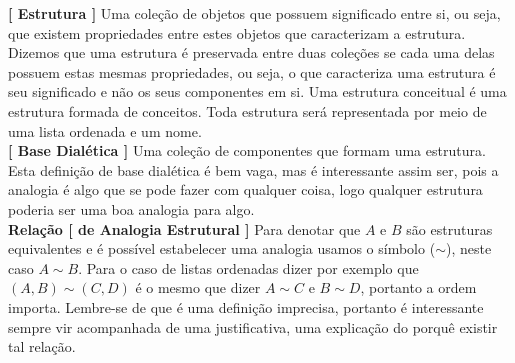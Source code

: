 \documentclass[10pt,a4paper]{report}
\begin{document}


\textbf{[ Estrutura ]} Uma coleção de objetos que possuem significado entre si, ou seja, que existem propriedades entre estes objetos que caracterizam a estrutura. Dizemos que uma estrutura é preservada entre duas coleções se cada uma delas possuem estas mesmas propriedades, ou seja, o que caracteriza uma estrutura é seu significado e não os seus componentes em si. Uma estrutura conceitual é uma estrutura formada de conceitos. Toda estrutura será representada por meio de uma lista ordenada e um nome. \\

\textbf{[ Base Dialética ]} Uma coleção de componentes que formam uma estrutura.\\

Esta definição de base dialética é bem vaga, mas é interessante assim ser, pois a analogia é algo que se pode fazer com qualquer coisa, logo qualquer estrutura poderia ser uma boa analogia para algo.\\


\textbf{Relação [ de Analogia Estrutural ]} Para denotar que $A$ e $B$ são estruturas equivalentes e é possível estabelecer uma analogia usamos o símbolo ($\sim$), neste caso $A \sim B$. Para o caso de listas ordenadas dizer por exemplo que $(A,B) \sim (C,D)$ é o mesmo que dizer $A \sim C$ e $B \sim D$,  portanto a ordem importa. Lembre-se de que é uma definição imprecisa, portanto é interessante sempre vir acompanhada de uma justificativa, uma explicação do porquê existir tal relação.\\
\end{document}
